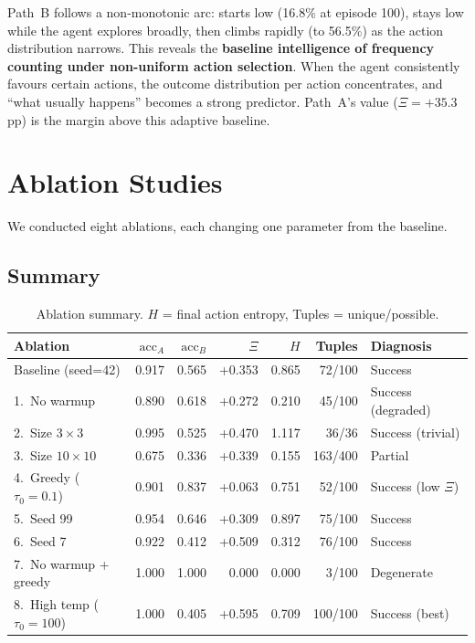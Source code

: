 \documentclass[11pt,a4paper]{article}
\begin{document}
Path~B follows a non-monotonic arc: starts low (16.8\% at episode 100), stays low while the agent explores broadly, then climbs rapidly (to 56.5\%) as the action distribution narrows. This reveals the \textbf{baseline intelligence of frequency counting under non-uniform action selection}. When the agent consistently favours certain actions, the outcome distribution per action concentrates, and ``what usually happens'' becomes a strong predictor. Path~A's value ($\Xi = +35.3$pp) is the margin above this adaptive baseline.

\section{Ablation Studies}
\label{sec:ablations}

We conducted eight ablations, each changing one parameter from the baseline.

\subsection{Summary}

\begin{table}[H]
\centering
\small
\begin{tabular}{lrrrrrl}
\toprule
Ablation & $\text{acc}_A$ & $\text{acc}_B$ & $\Xi$ & $H$ & Tuples & Diagnosis \\
\midrule
Baseline (seed=42) & 0.917 & 0.565 & +0.353 & 0.865 & 72/100 & Success \\
1.~No warmup & 0.890 & 0.618 & +0.272 & 0.210 & 45/100 & Success (degraded) \\
2.~Size $3\times3$ & 0.995 & 0.525 & +0.470 & 1.117 & 36/36 & Success (trivial) \\
3.~Size $10\times10$ & 0.675 & 0.336 & +0.339 & 0.155 & 163/400 & Partial \\
4.~Greedy ($\tau_0\!=\!0.1$) & 0.901 & 0.837 & +0.063 & 0.751 & 52/100 & Success (low $\Xi$) \\
5.~Seed 99 & 0.954 & 0.646 & +0.309 & 0.897 & 75/100 & Success \\
6.~Seed 7 & 0.922 & 0.412 & +0.509 & 0.312 & 76/100 & Success \\
7.~No warmup + greedy & 1.000 & 1.000 & 0.000 & 0.000 & 3/100 & Degenerate \\
8.~High temp ($\tau_0\!=\!100$) & 1.000 & 0.405 & +0.595 & 0.709 & 100/100 & Success (best) \\
\bottomrule
\end{tabular}
\caption{Ablation summary. $H$ = final action entropy, Tuples = unique/possible.}
\label{tab:ablations}
\end{table}
\end{document}

